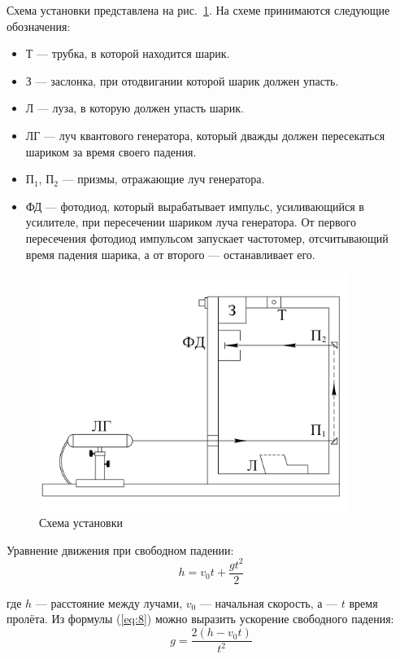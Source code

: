 Схема установки представлена на рис.~\ref{fig:Scheme}. На схеме принимаются следующие обозначения:
\begin{itemize}
\item Т — трубка, в которой находится шарик.
\item З — заслонка, при отодвигании которой шарик должен упасть.
\item Л — луза, в которую должен упасть шарик.
\item ЛГ — луч квантового генератора, который дважды должен пересекаться шариком за время своего падения.
\item П$_1$, П$_2$ — призмы, отражающие луч генератора.
\item ФД — фотодиод, который вырабатывает импульс, усиливающийся в усилителе, при пересечении шариком луча генератора. От первого пересечения фотодиод импульсом запускает частотомер, отсчитывающий время падения шарика, а от второго — останавливает его.
\end{itemize}

\begin{figure}[H]
\centering
\includegraphics[width=0.9\textwidth]{Scheme.png}
\caption{Схема установки}
\label{fig:Scheme}
\end{figure}

Уравнение движения при свободном падении:
\begin{equation}
\label{eq:8}
   h = v_0 t + \frac{gt^2}{2}
\end{equation}

где $h$ — расстояние между лучами, $v_0$ — начальная скорость, а — $t$ время пролёта.
Из формулы (\ref{eq:8}) можно выразить ускорение свободного падения:
\begin{equation}
\label{eq:9}
   g = \frac{2(h - v_0 t)}{t^2}
\end{equation}

